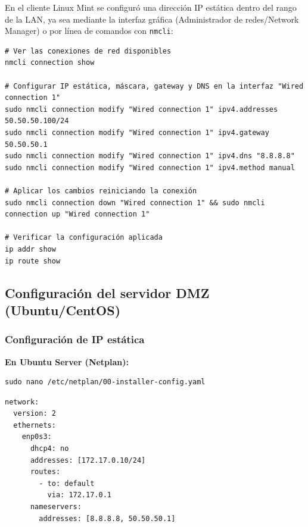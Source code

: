 \documentclass{article}
\renewcommand{\_}{\oldunderscore\hskip0pt\relax}
\begin{document}
En el cliente Linux Mint se configuró una dirección IP estática dentro
del rango de la LAN, ya sea mediante la interfaz gráfica (Administrador
de redes/Network Manager) o por línea de comandos con \texttt{nmcli}:

\begin{Verbatim}[fontsize=\footnotesize,frame=single,rulecolor=\color{codebg},fillcolor=\color{codebg},framesep=2mm,xleftmargin=1mm,xrightmargin=1mm,breaklines=true,breakanywhere=true,breaksymbolleft={},breaksymbolright={}]
# Ver las conexiones de red disponibles
nmcli connection show

# Configurar IP estática, máscara, gateway y DNS en la interfaz "Wired connection 1"
sudo nmcli connection modify "Wired connection 1" ipv4.addresses 50.50.50.100/24
sudo nmcli connection modify "Wired connection 1" ipv4.gateway 50.50.50.1
sudo nmcli connection modify "Wired connection 1" ipv4.dns "8.8.8.8"
sudo nmcli connection modify "Wired connection 1" ipv4.method manual

# Aplicar los cambios reiniciando la conexión
sudo nmcli connection down "Wired connection 1" && sudo nmcli connection up "Wired connection 1"

# Verificar la configuración aplicada
ip addr show
ip route show
\end{Verbatim}

\hypertarget{configuraciuxf3n-del-servidor-dmz-ubuntucentos}{%
\subsection{Configuración del servidor DMZ
(Ubuntu/CentOS)}\label{configuraciuxf3n-del-servidor-dmz-ubuntucentos}}

\hypertarget{configuraciuxf3n-de-ip-estuxe1tica}{%
\subsubsection{Configuración de IP
estática}\label{configuraciuxf3n-de-ip-estuxe1tica}}

\textbf{En Ubuntu Server (Netplan):}

\begin{Verbatim}[fontsize=\footnotesize,frame=single,rulecolor=\color{codebg},fillcolor=\color{codebg},framesep=2mm,xleftmargin=1mm,xrightmargin=1mm,breaklines=true,breakanywhere=true,breaksymbolleft={},breaksymbolright={}]
sudo nano /etc/netplan/00-installer-config.yaml
\end{Verbatim}

\begin{Verbatim}[fontsize=\footnotesize,frame=single,rulecolor=\color{codebg},fillcolor=\color{codebg},framesep=2mm,xleftmargin=1mm,xrightmargin=1mm,breaklines=true,breakanywhere=true,breaksymbolleft={},breaksymbolright={}]
network:
  version: 2
  ethernets:
    enp0s3:
      dhcp4: no
      addresses: [172.17.0.10/24]
      routes:
        - to: default
          via: 172.17.0.1
      nameservers:
        addresses: [8.8.8.8, 50.50.50.1]
\end{Verbatim}
\end{document}
